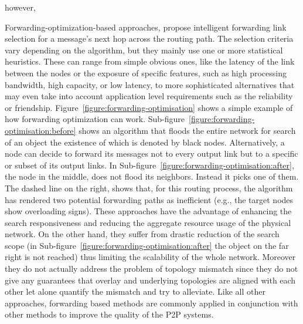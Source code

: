 however,


Forwarding-optimization-based
approaches, propose intelligent forwarding link selection for a message's next
hop across the routing path. The selection criteria vary depending on the
algorithm, but they mainly use one or more statistical heuristics. These can
range from simple obvious ones, like the latency of the link between the nodes or
the exposure of specific features, such as high processing bandwidth, high
capacity, or low latency, to more sophisticated alternatives that may even take
into account application level requirements such as the reliability or
friendship. Figure~\ref{figure:forwarding-optimisation} shows a simple example
of how forwarding optimization can work.
Sub-figure~\ref{figure:forwarding-optimisation:before} shows an algorithm that
floods the entire network for search of an object the existence of which is
denoted by black nodes. Alternatively, a node can decide to forward its
messages not to every output link but to a specific or subset of its output
links. In Sub-figure~\ref{figure:forwarding-optimisation:after}, the node in the
middle, does not flood its neighbors. Instead it picks one of them. The dashed
line on the right, shows that, for this routing process, the algorithm has
rendered two potential forwarding paths as inefficient (e.g., the target nodes
show overloading signs). These approaches have the advantage of enhancing the
search responsiveness and reducing the aggregate resource usage of the physical
network. On the other hand, they suffer from drastic reduction of the search
scope (in Sub-figure~\ref{figure:forwarding-optimisation:after} the object on
the far right is not reached) thus limiting the scalability of the whole
network. Moreover they do not actually address the problem of topology mismatch
since they do not give any guarantees that overlay and underlying topologies are
aligned with each other let alone quantify the mismatch and try to alleviate.
Like all other approaches, forwarding based methods are commonly applied in
conjunction with other methods to improve the quality of the P2P systems.


